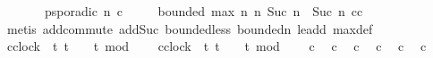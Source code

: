 \begin{isabellebody}
\ \ \ \ \ \ \ {\isacartoucheopen}p{\isacharunderscore}sporadic\ n{\isacharprime}\ c{\isacharprime}{\isacartoucheclose}\isanewline
\ \ \ \ \ {\isacartoucheopen}bounded\ {\isacharparenleft}max\ n\ n{\isacharprime}{\isacharparenright}\ {\isacharparenleft}Suc\ n\ {\isacharplus}\ Suc\ n{\isacharprime}{\isacharparenright}\ {\isacharparenleft}c{\isasymoplus}c{\isacharprime}{\isacharparenright}{\isacartoucheclose}\isanewline
%
\isadelimproof
%
\endisadelimproof
%
\isatagproof
{}\isamarkupfalse%
\ {\isacharparenleft}metis\ add{\isachardot}commute\ add{\isacharunderscore}Suc\ bounded{\isacharunderscore}less\ bounded{\isacharunderscore}n\ le{\isacharunderscore}add{}\ max{\isacharunderscore}def{\isacharparenright}%
\endisatagproof
{\isafoldproof}%
%
\isadelimproof
%
\endisadelimproof
%
\isadelimdocument
%
\endisadelimdocument
%
\isatagdocument
%
\isamarkuptrue%
%
\endisatagdocument
{\isafolddocument}%
%
\isadelimdocument
%
\endisadelimdocument
{}\isamarkupfalse%
\ {\isacartoucheopen}c{}{\isacharcolon}{\isacharcolon}clock\ {\isasymequiv}\ {\isacharparenleft}{\isasymlambda}t{\isachardot}\ t\ {\isasymge}\ {}\ {\isasymand}\ {\isacharparenleft}t{\isacharminus}{}{\isacharparenright}\ mod\ {}\ {\isacharequal}\ {}{\isacharparenright}{\isacartoucheclose}\isanewline
{}\isamarkupfalse%
\ {\isacartoucheopen}c{}{\isacharcolon}{\isacharcolon}clock\ {\isasymequiv}\ {\isacharparenleft}{\isasymlambda}t{\isachardot}\ t\ {\isasymge}\ {}\ {\isasymand}\ {\isacharparenleft}t{\isacharminus}{}{\isacharparenright}\ mod\ {}\ {\isacharequal}\ {}{\isacharparenright}{\isacartoucheclose}\isanewline
\isanewline
{}\isamarkupfalse%
\ {\isacartoucheopen}c{}\ {}{\isacartoucheclose}\isanewline
{}\isamarkupfalse%
\ {\isacartoucheopen}c{}\ {}{\isacartoucheclose}\isanewline
{}\isamarkupfalse%
\ {\isacartoucheopen}c{}\ {}{\isacartoucheclose}\isanewline
{}\isamarkupfalse%
\ {\isacartoucheopen}c{}\ {}{\isacartoucheclose}\isanewline
\isanewline
{}\isamarkupfalse%
\ {\isacartoucheopen}c{}\ {}{\isacartoucheclose}\isanewline
{}\isamarkupfalse%
\ {\isacartoucheopen}c{}\ {}{\isacartoucheclose}\isanewline
{}\isamarkupfalse%

\end{isabellebody}

